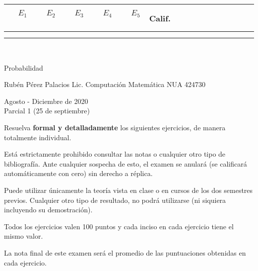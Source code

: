 \documentclass[10pt]{extarticle}
\begin{document}
 \begin{flushright}
  \begin{tabular}{|c|c|c|c|c|c|c|c|c|c|c|c|c|c|c|c|}
  \hline
  \ \ $E_1$\ \ &\ \ $E_2$\ \ &\ \ $E_3$\ \ &\ \ $E_4$\ \ &\ \ $E_5$\ \ &Calif.\\
  \hline
  & &  & & & \\
    & &  & & &\\
   \hline
 \end{tabular}\\
 \end{flushright}
\begin{center}
\large
Probabilidad
\normalsize

Rubén Pérez Palacios
Lic. Computación Matemática
NUA 424730

Agosto - Diciembre de 2020\\

Parcial 1 (25 de septiembre)
\end{center}

Resuelva \textbf{formal y detalladamente} los siguientes ejercicios, de manera totalmente individual.

Está estrictamente prohibido consultar las notas o cualquier otro tipo de bibliografía. Ante cualquier sospecha de esto, el examen se anulará (se calificará automáticamente con cero) sin derecho a réplica.

Puede utilizar únicamente la teoría vista en clase o en cursos de los dos semestres previos. Cualquier otro tipo de resultado, no podrá utilizarse (ni siquiera incluyendo su demostración).

Todos los ejercicios valen 100 puntos y cada inciso en cada ejercicio tiene el mismo valor.

La nota final de este examen será el promedio de las puntuaciones obtenidas en cada ejercicio.
\end{document}
